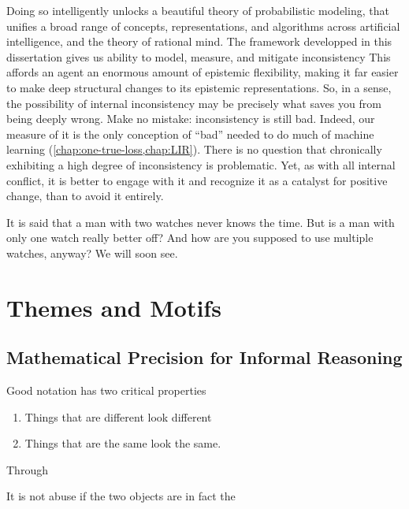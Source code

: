 Doing so intelligently unlocks a beautiful theory of probabilistic modeling, that unifies a broad range of concepts, representations, and algorithms across artificial intelligence, and the theory of rational mind. 
The framework developped in this dissertation
gives us
ability to model, measure, and mitigate inconsistency 
This affords an agent an enormous amount of epistemic flexibility,
    making it far easier to make deep structural changes to its epistemic
    representations.
So, in a sense, the possibility of internal inconsistency may be precisely what saves you from being deeply wrong. 
%
Make no mistake: inconsistency is still bad.
Indeed, our measure of it is the only conception of ``bad'' needed to do much of machine learning (\cref{chap:one-true-loss,chap:LIR}).
There is no question that chronically exhibiting a high degree of inconsistency is problematic.
%
Yet, as with all internal conflict, it is better to engage with it and recognize it as a catalyst for positive change, 
than to avoid it entirely. 

%
It is said that a man with two watches never knows the time.  
But is a man with only one watch really better off?
And how are you supposed to use multiple watches, anyway?
We will soon see. 


\section{Themes and Motifs}



\subsection{Mathematical Precision for Informal Reasoning}

Good notation has two critical properties
\begin{enumerate}
    \item Things that are different look different
    \item Things that are the same look the same. 
\end{enumerate}
Through 

It is not abuse if the two objects are in fact the 

